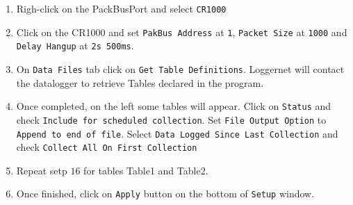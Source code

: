 \begin{enumerate}
	\item Righ-click on the PackBusPort and select {\tt CR1000}
	\item Click on the CR1000 and set {\tt PakBus Address} at {\tt 1}, {\tt Packet Size} at {\tt 1000} and {\tt Delay Hangup} at {\tt 2s 500ms}.
	\item On {\tt Data Files} tab click on {\tt Get Table Definitions}. Loggernet will contact the datalogger to retrieve Tables declared in the program.
	\item Once completed, on the left some tables will appear. Click on {\tt Status} and check {\tt Include for scheduled collection}. Set {\tt File Output Option} to {\tt Append to end of file}. Select {\tt Data Logged Since Last Collection} and check {\tt Collect All On First Collection}
	\item Repeat setp $16$ for tables Table1 and Table2.
	\item Once finished, click on {\tt Apply} button on the bottom of {\tt Setup} window.
\end{enumerate}